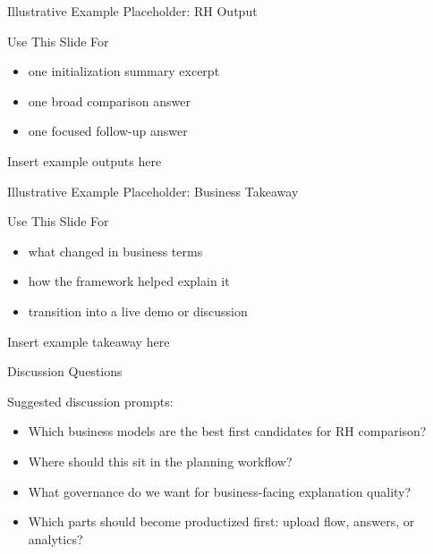 \documentclass[10pt]{beamer}
\begin{document}
\begin{frame}{Illustrative Example Placeholder: RH Output}
  \begin{block}{Use This Slide For}
    \begin{itemize}
      \item one initialization summary excerpt
      \item one broad comparison answer
      \item one focused follow-up answer
    \end{itemize}
  \end{block}
  \vfill
  \centering
  \Large Insert example outputs here
  \vfill
\end{frame}

\begin{frame}{Illustrative Example Placeholder: Business Takeaway}
  \begin{block}{Use This Slide For}
    \begin{itemize}
      \item what changed in business terms
      \item how the framework helped explain it
      \item transition into a live demo or discussion
    \end{itemize}
  \end{block}
  \vfill
  \centering
  \Large Insert example takeaway here
  \vfill
\end{frame}

\begin{frame}{Discussion}
  \centering
  \Large Questions
  \vspace{1em}

  \normalsize
  Suggested discussion prompts:
  \begin{itemize}
    \item Which business models are the best first candidates for RH comparison?
    \item Where should this sit in the planning workflow?
    \item What governance do we want for business-facing explanation quality?
    \item Which parts should become productized first: upload flow, answers, or analytics?
  \end{itemize}
\end{frame}
\end{document}
